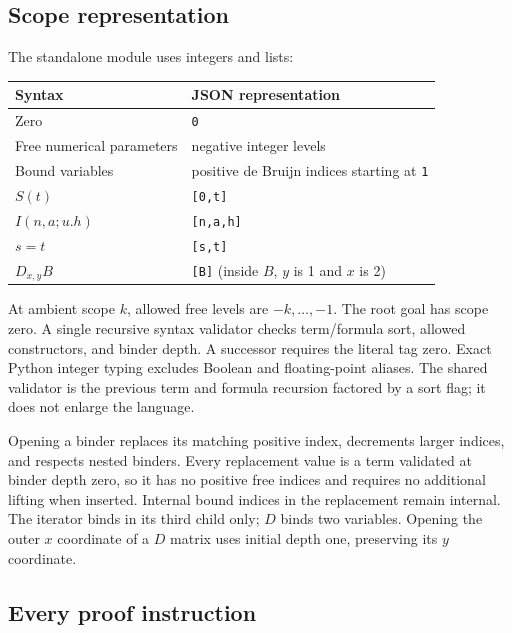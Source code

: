 \documentclass[11pt,letterpaper]{article}
\theoremstyle{definition}\newtheorem{definition}[theorem]{Definition}
\begin{document}
\subsection{Scope representation}

The standalone module  uses integers and lists:
\begin{center}
\begin{tabular}{ll}
\toprule
Syntax & JSON representation\\
\midrule
Zero & \texttt{0}\\
Free numerical parameters & negative integer levels\\
Bound variables & positive de Bruijn indices starting at \texttt{1}\\
$S(t)$ & \texttt{[0,t]}\\
$I(n,a;u.h)$ & \texttt{[n,a,h]}\\
$s=t$ & \texttt{[s,t]}\\
$D_{x,y}B$ & \texttt{[B]} (inside $B$, $y$ is 1 and $x$ is 2)\\
\bottomrule
\end{tabular}
\end{center}
At ambient scope $k$, allowed free levels are $-k,\ldots,-1$.
The root goal has scope zero. A single recursive syntax validator checks
term/formula sort, allowed constructors, and binder depth. A successor
requires the literal tag zero. Exact Python integer typing excludes Boolean
and floating-point aliases. The shared validator is the previous term and
formula recursion factored by a sort flag; it does not enlarge the language.

Opening a binder replaces its matching positive index, decrements larger
indices, and respects nested binders. Every replacement value is a term
validated at binder depth zero, so it has no positive free indices and
requires no additional lifting when inserted. Internal bound indices in
the replacement remain internal. The iterator binds in its third child
only; $D$ binds two variables. Opening the outer $x$ coordinate of a $D$
matrix uses initial depth one, preserving its $y$ coordinate.

\subsection{Every proof instruction}
\end{document}
